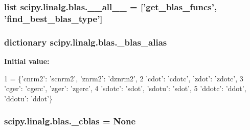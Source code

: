 \subsubsection[{\+\_\+\+\_\+all\+\_\+\+\_\+}]{\setlength{\rightskip}{0pt plus 5cm}list scipy.\+linalg.\+blas.\+\_\+\+\_\+all\+\_\+\+\_\+ = \mbox{[}'{\bf get\+\_\+blas\+\_\+funcs}', '{\bf find\+\_\+best\+\_\+blas\+\_\+type}'\mbox{]}}\label{namespacescipy_1_1linalg_1_1blas_a0dcbeb3cf5c3d21a477265e62a1c347c}
\hypertarget{namespacescipy_1_1linalg_1_1blas_a86f2b236405f2917ec9382e6178a285d}{}
\subsubsection[{\+\_\+blas\+\_\+alias}]{\setlength{\rightskip}{0pt plus 5cm}dictionary scipy.\+linalg.\+blas.\+\_\+blas\+\_\+alias}\label{namespacescipy_1_1linalg_1_1blas_a86f2b236405f2917ec9382e6178a285d}
{\bfseries Initial value\+:}
\begin{DoxyCode}
1 = \{\textcolor{stringliteral}{'cnrm2'}: \textcolor{stringliteral}{'scnrm2'}, \textcolor{stringliteral}{'znrm2'}: \textcolor{stringliteral}{'dznrm2'},
2                \textcolor{stringliteral}{'cdot'}: \textcolor{stringliteral}{'cdotc'}, \textcolor{stringliteral}{'zdot'}: \textcolor{stringliteral}{'zdotc'},
3                \textcolor{stringliteral}{'cger'}: \textcolor{stringliteral}{'cgerc'}, \textcolor{stringliteral}{'zger'}: \textcolor{stringliteral}{'zgerc'},
4                \textcolor{stringliteral}{'sdotc'}: \textcolor{stringliteral}{'sdot'}, \textcolor{stringliteral}{'sdotu'}: \textcolor{stringliteral}{'sdot'},
5                \textcolor{stringliteral}{'ddotc'}: \textcolor{stringliteral}{'ddot'}, \textcolor{stringliteral}{'ddotu'}: \textcolor{stringliteral}{'ddot'}\}
\end{DoxyCode}
\hypertarget{namespacescipy_1_1linalg_1_1blas_a1390450de1aa42a0d5d1d18a8ff0b687}{}
\subsubsection[{\+\_\+cblas}]{\setlength{\rightskip}{0pt plus 5cm}scipy.\+linalg.\+blas.\+\_\+cblas = None}\label{namespacescipy_1_1linalg_1_1blas_a1390450de1aa42a0d5d1d18a8ff0b687}
\hypertarget{namespacescipy_1_1linalg_1_1blas_ab328cec4e8cdff29330faa8f2b135cbe}{}
